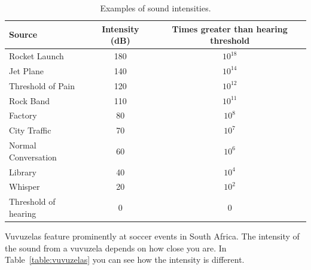 \begin{table}[H]
\begin{center}
\begin{tabular}{|l|c|c|}\hline
\textbf{Source}&\textbf{Intensity} (dB) & \textbf{Times greater than hearing threshold}\\\hline
Rocket Launch &180 & $10^{18}$\\
Jet Plane & 140 & $10^{14}$ \\
Threshold of Pain & 120 & $10^{12}$\\
Rock Band & 110 & $10^{11}$\\
Factory & 80 & $10^{8}$\\
City Traffic & 70 & $10^{7}$\\
Normal Conversation & 60 & $10^{6}$\\
Library & 40 & $10^{4}$\\
Whisper & 20 & $10^{2}$\\
Threshold of hearing & 0 & 0\\
\hline
\end{tabular}
\end{center}
\caption{Examples of sound intensities.}
\label{p:wsl:s11:intensity}
\end{table}

Vuvuzelas feature prominently at soccer events in South Africa. The intensity of the sound from a vuvuzela depends on how close you are. In Table~\ref{table:vuvuzelas} you can see how the intensity is different.

